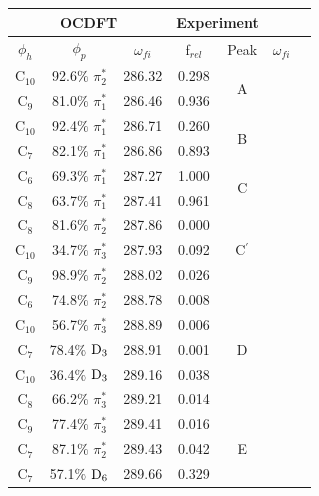 \documentclass[12pt]{article}
\begin{document}
 \begin{table}
 	\centering
     \begin{tabular}{c@{\hskip 0.22in}c@{\hskip 0.22in}c@{\hskip 0.22in}c@{\hskip 0.52in}c@{\hskip 0.22in}c@{\hskip 0.22in}c}
     \hline
     \hline
   \multicolumn{3}{c}{OCDFT} &\multicolumn{2}{c}{Experiment} \\
   \hline
 $\phi_h$ &  $\phi_p$ & $\omega_{fi}$ & f$_{rel}$ & Peak &  $\omega_{fi}$   \\
   \hline
    C$_{10}$
 &   92.6$\%$ $\pi_2^*$  & 286.32 & 0.298 & \multirow{2}{*}{A} \\
    C$_9$
 &   81.0$\%$ $\pi_1^*$  & 286.46 & 0.936 
 \vspace{0.1in}\\
    C$_{10}$
 &   92.4$\%$ $\pi_1^*$  & 286.71 & 0.260 &  \multirow{2}{*}{B} \\
    C$_7$
 &   82.1$\%$ $\pi_1^*$  & 286.86 & 0.893 
 \vspace{0.1in}\\
    C$_6$
 &   69.3$\%$ $\pi_1^*$  & 287.27 & 1.000 &  \multirow{2}{*}{C}\\
    C$_8$
 &   63.7$\%$ $\pi_1^*$  & 287.41 & 0.961 
 \vspace{0.1in}\\
    C$_8$
 &   81.6$\%$ $\pi_2^*$  & 287.86 & 0.000 &  \multirow{3}{*}{C$^{\prime}$} \\
    C$_{10}$
 &   34.7$\%$ $\pi_3^*$  & 287.93 & 0.092 \\
    C$_9$
 &   98.9$\%$ $\pi_2^*$
 & 288.02 & 0.026 
 \vspace{0.1in}\\
    C$_6$
 &   74.8$\%$ $\pi_2^*$  & 288.78 & 0.008 & \multirow{5}{*}{D} \\
    C$_{10}$
 &   56.7$\%$ $\pi_3^*$  & 288.89 & 0.006 \\
    C$_7$
 &   78.4$\%$ $\rm D_3$  & 288.91 & 0.001 \\
    C$_{10}$
 &   36.4$\%$ $\rm D_3$  & 289.16 & 0.038 \\
    C$_8$
 &   66.2$\%$ $\pi_3^*$  & 289.21 & 0.014 
 \vspace{0.1in}\\
    C$_9$
 &   77.4$\%$ $\pi_3^*$  & 289.41 & 0.016 & \multirow{3}{*}{E} \\
    C$_7$
 &   87.1$\%$ $\pi_2^*$  & 289.43 & 0.042 \\
    C$_7$
 &   57.1$\%$ $\rm D_6$  & 289.66 & 0.329 
 \vspace{0.1in}\\

\end{tabular}
\end{table}
\end{document}
